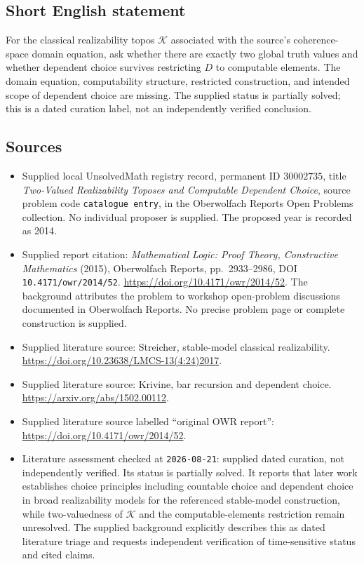 \documentclass[11pt]{article}
\begin{document}
\subsection{Short English statement}
For the classical realizability topos \(\mathcal K\) associated with the source's coherence-space domain equation, ask whether there are exactly two global truth values and whether dependent choice survives restricting \(D\) to computable elements. The domain equation, computability structure, restricted construction, and intended scope of dependent choice are missing. The supplied status is partially solved; this is a dated curation label, not an independently verified conclusion.
\subsection{Sources}
\begin{itemize}
\item Supplied local UnsolvedMath registry record, permanent ID \(30002735\), title \emph{Two-Valued Realizability Toposes and Computable Dependent Choice}, source problem code \texttt{catalogue entry}, in the Oberwolfach Reports Open Problems collection. No individual proposer is supplied. The proposed year is recorded as 2014.
\item Supplied report citation: \emph{Mathematical Logic: Proof Theory, Constructive Mathematics} (2015), Oberwolfach Reports, pp.\ 2933--2986, DOI \texttt{10.4171/owr/2014/52}. \url{https://doi.org/10.4171/owr/2014/52}. The background attributes the problem to workshop open-problem discussions documented in Oberwolfach Reports. No precise problem page or complete construction is supplied.
\item Supplied literature source: Streicher, stable-model classical realizability. \url{https://doi.org/10.23638/LMCS-13(4:24)2017}.
\item Supplied literature source: Krivine, bar recursion and dependent choice. \url{https://arxiv.org/abs/1502.00112}.
\item Supplied literature source labelled ``original OWR report'': \url{https://doi.org/10.4171/owr/2014/52}.
\item Literature assessment checked at \texttt{2026-08-21}: supplied dated curation, not independently verified. Its status is partially solved. It reports that later work establishes choice principles including countable choice and dependent choice in broad realizability models for the referenced stable-model construction, while two-valuedness of \(\mathcal K\) and the computable-elements restriction remain unresolved. The supplied background explicitly describes this as dated literature triage and requests independent verification of time-sensitive status and cited claims.
\end{itemize}
\end{document}
